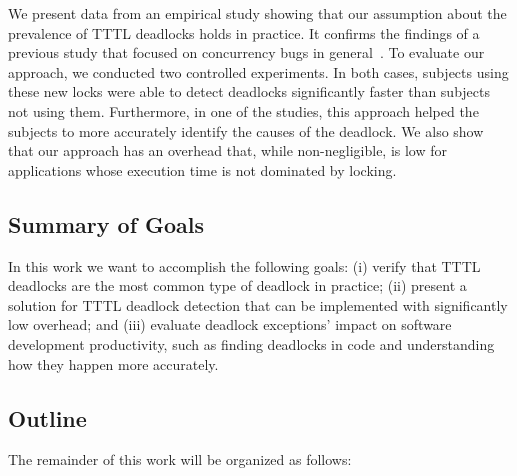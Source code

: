 We present data from an empirical study showing that our assumption about the prevalence of TTTL deadlocks holds in practice. It confirms the findings of a previous study that focused on concurrency bugs in general~\cite{lu}. 
To evaluate our approach, we conducted two controlled experiments. In both cases, subjects using these new locks were able to detect deadlocks significantly faster than subjects not using them.  Furthermore, in one of the studies, this approach helped the subjects to more accurately identify the causes of the deadlock. We also show that our approach has an overhead that, while non-negligible, is low for applications whose execution time is not dominated by locking.

\subsection{Summary of Goals}

In this work we want to accomplish the following goals:
(i) verify that TTTL deadlocks are the most common type of deadlock in practice;
(ii) present a solution for TTTL deadlock detection that can be implemented with significantly low overhead;
and (iii) evaluate deadlock exceptions' impact on software development productivity, such as finding deadlocks in code and understanding how they happen more accurately.

\subsection{Outline}

The remainder of this work will be organized as follows:

